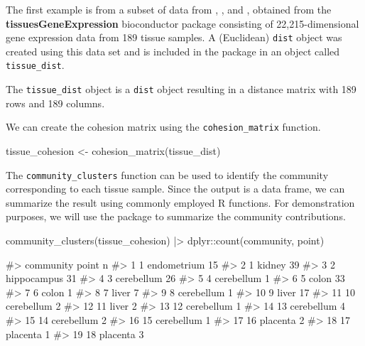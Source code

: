 The first example is from a subset of data from \citet{zilliox2007gene},
\citet{mccall2011gene}, and \citet{mccall2014gene}, obtained from the
\textbf{tissuesGeneExpression} bioconductor package \citep{tissue}
consisting of 22,215-dimensional gene expression data from 189 tissue
samples. A (Euclidean) \texttt{dist} object was created using this data
set and is included in the  package in an object called
\texttt{tissue\_dist}.

The \texttt{tissue\_dist} object is a \texttt{dist} object resulting in
a distance matrix with 189 rows and 189 columns.

We can create the cohesion matrix using the \texttt{cohesion\_matrix}
function.

\begin{Schunk}
\begin{Sinput}
tissue_cohesion <- cohesion_matrix(tissue_dist)
\end{Sinput}
\end{Schunk}

The \texttt{community\_clusters} function can be used to identify the
community corresponding to each tissue sample. Since the output is a
data frame, we can summarize the result using commonly employed R
functions. For demonstration purposes, we will use the 
package to summarize the community contributions.

\begin{Schunk}
\begin{Sinput}
community_clusters(tissue_cohesion) |>
  dplyr::count(community, point)
\end{Sinput}
\begin{Soutput}
#>    community       point  n
#> 1          1 endometrium 15
#> 2          1      kidney 39
#> 3          2 hippocampus 31
#> 4          3  cerebellum 26
#> 5          4  cerebellum  1
#> 6          5       colon 33
#> 7          6       colon  1
#> 8          7       liver  7
#> 9          8  cerebellum  1
#> 10         9       liver 17
#> 11        10  cerebellum  2
#> 12        11       liver  2
#> 13        12  cerebellum  1
#> 14        13  cerebellum  4
#> 15        14  cerebellum  2
#> 16        15  cerebellum  1
#> 17        16    placenta  2
#> 18        17    placenta  1
#> 19        18    placenta  3
\end{Soutput}
\end{Schunk}

